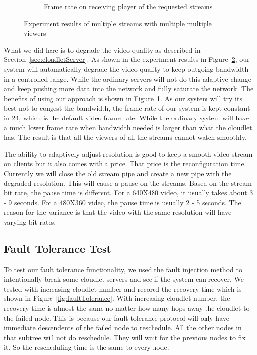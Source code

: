 \documentclass[letterpaper,twocolumn,10pt]{article}
\begin{document}
\begin{figure}[t]
\begin{subfigure}[t]{0.22\textwidth}
                \caption{Frame rate on receiving player of the requested streams}
                \label{fig:mulFps}
        \end{subfigure}
        \caption{Experiment results of multiple streams with multiple multiple viewers}\label{fig:MultiStream}
\end{figure}

What we did here is to degrade the video quality as described in Section~\ref{sec:cloudletServer}. As shown in the experiment results in Figure~\ref{fig:MultiStream}, our system will automatically degrade the video quality to keep outgoing bandwidth in a controlled range. While the ordinary servers will not do this adaptive change and keep pushing more data into the network and fully saturate the network. The benefits of using our approach is shown in Figure~\ref{fig:mulFps}. As our system will try its best not to congest the bandwidth, the frame rate of our system is kept constant in 24, which is the default video frame rate. While the ordinary system will have a much lower frame rate when bandwidth needed is larger than what the cloudlet has. The result is that all the viewers of all the streams cannot watch smoothly.

The ability to adaptively adjust resolution is good to keep a smooth video stream on clients but it also comes with a price. That price is the reconfiguration time. Currently we will close the old stream pipe and create a new pipe with the degraded resolution. This will cause a pause on the streams. Based on the stream bit rate, the pause time is different. For a 640X480 video, it usually takes about 3 - 9 seconds. For a 480X360 video, the pause time is usually 2 - 5 seconds. The reason for the variance is that the video with the same resolution will have varying bit rates.

\subsection{Fault Tolerance Test}

To test our fault tolerance functionality, we used the fault injection method to intentionally break some cloudlet servers and see if the system can recover. We tested with increasing cloudlet number and recored the recovery time which is shown in Figure~\ref{fig:faultTolerance}. With increasing cloudlet number, the recovery time is almost the same no matter how many hops away the cloudlet to the failed node. This is because our fault tolerance protocol will only have immediate descendents of the failed node to reschedule. All the other nodes in that subtree will not do reschedule. They will wait for the previous nodes to fix it. So the rescheduling time is the same to every node. 
\end{document}
